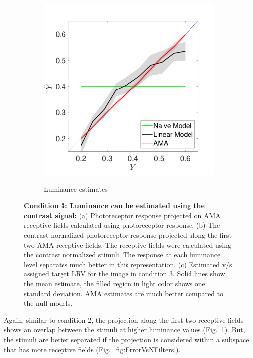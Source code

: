 \documentclass{jov}
\begin{document}
\begin{figure}
\begin{subfigure}[b]{0.3 \textwidth}
        \label{fig:constrastWorks}
    \end{subfigure}
            \begin{subfigure}[b]{0.3 \textwidth}
        \caption{Luminance estimates}
        \includegraphics[width=\textwidth]{../Figures/Figure12/Figure12_c.pdf}
        \label{fig:case10Results}
    \end{subfigure}
    \caption{{\bf Condition 3: Luminance can be estimated using the contrast signal:} (a) Photoreceptor response projected on AMA receptive fields calculated using photoreceptor response. (b) The contrast normalized photoreceptor response projected along the first two AMA receptive fields. The receptive fields were calculated using the contrast normalized stimuli. The response at each luminance level separates much better in this representation. (c) Estimated v/s assigned target LRV for the image in condition 3. Solid lines show the mean estimate, the filled region in light color  shows one standard deviation. AMA estimates are much better compared to the null models.}
\label{fig:importanceOfConstrast}
\end{figure}

Again, similar to condition 2, the projection along the first two receptive fields shows an overlap between the stimuli at higher luminance values (Fig.~\ref{fig:constrastWorks}). But, the stimuli are better separated if the projection is considered within a subspace that has more receptive fields (Fig.~\ref{fig:ErrorVsNFilters}).
\end{document}
